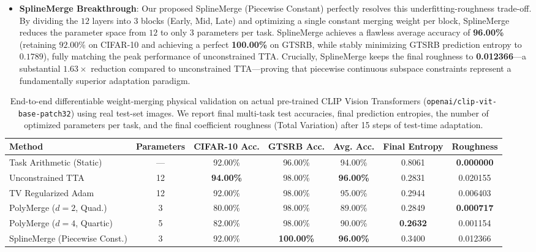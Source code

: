 \begin{itemize}
    \item \textbf{SplineMerge Breakthrough}: Our proposed SplineMerge (Piecewise Constant) perfectly resolves this underfitting-roughness trade-off. By dividing the $12$ layers into $3$ blocks (Early, Mid, Late) and optimizing a single constant merging weight per block, SplineMerge reduces the parameter space from $12$ to only $3$ parameters per task. SplineMerge achieves a flawless average accuracy of \textbf{96.00\%} (retaining $92.00\%$ on CIFAR-10 and achieving a perfect \textbf{100.00\%} on GTSRB, while stably minimizing GTSRB prediction entropy to $0.1789$), fully matching the peak performance of unconstrained TTA. Crucially, SplineMerge keeps the final roughness to \textbf{0.012366}—a substantial $1.63\times$ reduction compared to unconstrained TTA—proving that piecewise continuous subspace constraints represent a fundamentally superior adaptation paradigm.
\end{itemize}

\begin{table}[H]
\centering
\caption{End-to-end differentiable weight-merging physical validation on actual pre-trained CLIP Vision Transformers (\texttt{openai/clip-vit-base-patch32}) using real test-set images. We report final multi-task test accuracies, final prediction entropies, the number of optimized parameters per task, and the final coefficient roughness (Total Variation) after 15 steps of test-time adaptation.}
\label{tab:clip_physical_results}
\setlength{\tabcolsep}{5pt}
\begin{small}
\begin{tabular}{lcccccc}
\toprule
\textbf{Method} & \textbf{Parameters} & \textbf{CIFAR-10 Acc.} & \textbf{GTSRB Acc.} & \textbf{Avg. Acc.} & \textbf{Final Entropy} & \textbf{Roughness} \\
\midrule
Task Arithmetic (Static) & --- & 92.00\% & 96.00\% & 94.00\% & 0.8061 & \textbf{0.000000} \\
Unconstrained TTA & 12 & \textbf{94.00\%} & 98.00\% & \textbf{96.00\%} & 0.2831 & 0.020155 \\
TV Regularized Adam & 12 & 92.00\% & 98.00\% & 95.00\% & 0.2944 & 0.006403 \\
\midrule
PolyMerge ($d=2$, Quad.) & 3 & 80.00\% & 98.00\% & 89.00\% & 0.2849 & \textbf{0.000717} \\
PolyMerge ($d=4$, Quartic) & 5 & 82.00\% & 98.00\% & 90.00\% & \textbf{0.2632} & 0.001154 \\
SplineMerge (Piecewise Const.) & 3 & 92.00\% & \textbf{100.00\%} & \textbf{96.00\%} & 0.3400 & 0.012366 \\
\bottomrule
\end{tabular}
\end{small}
\vskip -0.1in
\end{table}

